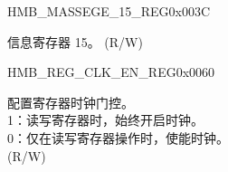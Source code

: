\begin{register}{H}{MB\_MASSEGE\_15\_REG}{0x003C}\label{regdesc:MBMESSAGE15REG}
%
\regnewline%
\begin{regdesc}\begin{reglist}
\label{fielddesc:MBMESSAGE15}\item [MB\_MASSEGE\_15] 信息寄存器 15。 (R/W)
\end{reglist}\end{regdesc}
\end{register}


\begin{register}{H}{MB\_REG\_CLK\_EN\_REG}{0x0060}\label{regdesc:MBREGCLKENREG}
%
%
\regnewline%
\begin{regdesc}\begin{reglist}
\label{fielddesc:MBREGCLKEN}\item [MB\_REG\_CLK\_EN] 配置寄存器时钟门控。\\
1：读写寄存器时，始终开启时钟。\\
0：仅在读写寄存器操作时，使能时钟。\\ (R/W)
\end{reglist}\end{regdesc}
\end{register}


